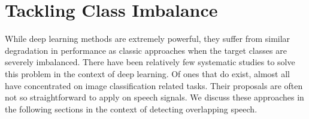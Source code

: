\documentclass[a4paper]{article}
\begin{document}
\section{Tackling Class Imbalance}
While deep learning methods are extremely powerful,
they suffer from similar degradation in performance as classic approaches when the target classes are severely imbalanced.
There have been relatively few systematic studies to solve this problem in the context of deep learning.
Of ones that do exist, almost all have concentrated on image classification related tasks.  %
Their proposals are often not so straightforward to apply on speech signals.
We discuss these approaches in the following sections in the context of detecting overlapping speech.

\end{document}
